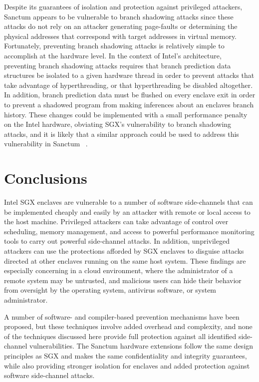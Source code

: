 Despite its guarantees of isolation and protection against privileged attackers, Sanctum appears to be vulnerable to branch shadowing attacks since these attacks do not rely on an attacker generating page-faults or determining the physical addresses that correspond with target addresses in virtual memory. Fortunately, preventing branch shadowing attacks is relatively simple to accomplish at the hardware level. In the context of Intel's architecture, preventing branch shadowing attacks requires that branch prediction data structures be isolated to a given hardware thread in order to prevent attacks that take advantage of hyperthreading, or that hyperthreading be disabled altogether. In addition, branch prediction data must be flushed on every enclave exit in order to prevent a shadowed program from making inferences about an enclaves branch history. These changes could be implemented with a small performance penalty on the Intel hardware, obviating SGX's vulnerability to branch shadowing attacks, and it is likely that a similar approach could be used to address this vulnerability in Sanctum ~\cite{costan_sanctum:_2016, costan_sanctum:_2015, lee_inferring_2017}.

\section{Conclusions}

Intel SGX enclaves are vulnerable to a number of software side-channels that can be implemented cheaply and easily by an attacker with remote or local access to the host machine. Privileged attackers can take advantage of control over scheduling, memory management, and access to powerful performance monitoring tools to carry out powerful side-channel attacks. In addition, unprivileged attackers can use the protections afforded by SGX enclaves to disguise attacks directed at other enclaves running on the same host system. These findings are especially concerning in a cloud environment, where the administrator of a remote system may be untrusted, and malicious users can hide their behavior from oversight by the operating system, antivirus software, or system administrator. 

A number of software- and compiler-based prevention mechanisms have been proposed, but these techniques involve added overhead and complexity, and none of the techniques discussed here provide full protection against all identified side-channel vulnerabilities. The Sanctum hardware extensions follow the same design principles as SGX and makes the same confidentiality and integrity guarantees, while also providing stronger isolation for enclaves and added protection against software side-channel attacks. 


